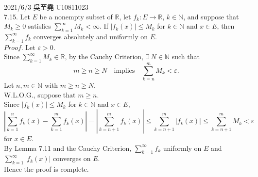 \documentclass[12pt]{book}
\author{andersonwu2000}
\begin{document}
\begin{CJK}{UTF8}{bsmi}

\hfill 2021/6/3 吳至堯 U10811023 \\

7.15. Let $E$ be a nonempty subset of $\mathbb{R}$, let $f_k:E\rightarrow\mathbb{R}$, $k\in\mathbb{N}$, and suppose that $M_k\ge0$ satisfies $\sum_{k=1}^\infty M_k<\infty$. If $|f_k(x)|\le M_k$ for $k\in\mathbb{N}$ and $x\in E$, then $\sum_{k=1}^\infty f_k$ converges absolutely and uniformly on $E$. \\
$Proof$. Let $\varepsilon>0$. \\
Since $\sum_{k=1}^\infty M_k\in\mathbb{R}$, by the Cauchy Criterion, $\exists\ N\in\mathbb{N}$ such that 
\[
m\ge n\ge N\quad\text{implies}\quad\sum_{k=n}^m M_k<\varepsilon.
\]
Let $n, m\in\mathbb{N}$ with $m\ge n\ge N$. \\
W.L.O.G., suppose that $m\ge n$. \\
Since $|f_k(x)|\le M_k$ for $k\in\mathbb{N}$ and $x\in E$,
\[
\left|\sum_{k=1}^n f_k(x)-\sum_{k=1}^m f_k(x)\right|
=\left|\sum_{k=n+1}^m f_k(x)\right|
\le\sum_{k=n+1}^m |f_k(x)|
\le\sum_{k=n+1}^m M_k
<\varepsilon
\]
for $x\in E$. \\
By Lemma 7.11 and the Cauchy Criterion, $\sum_{k=1}^\infty f_k$ uniformly on $E$ and $\sum_{k=1}^\infty |f_k(x)|$ converges on $E$. \\
Hence the proof is complete.

\end{CJK}
\end{document}

